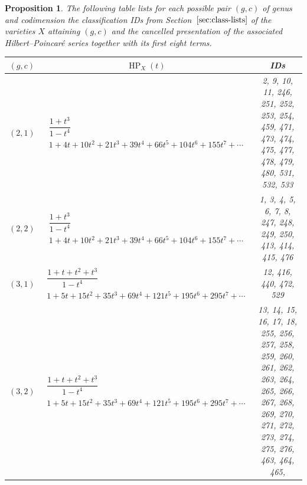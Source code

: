 \documentclass[pdftex]{sigma}%
\newtheorem{prop}[thm]{Proposition}
\theoremstyle{definition}
\DeclareMathOperator\HP{HP}
\numberwithin{equation}{section}
\begin{document}
\begin{prop}
The following table lists for each possible pair $(g,c)$
of genus and codimension the classification IDs
from Section~$\ref{sec:class-lists}$ of the varieties
$X$ attaining $(g,c)$ and the cancelled presentation
of the associated Hilbert--Poincar\'{e}
series together with its first eight terms.
\begin{table}[h!]\centering\setlength{\tabcolsep}{4.5pt}
\renewcommand{\arraystretch}{1.4}\small\tabulinesep=1mm
\begin{tabu}{c|c|c}\hline
 $(g,c)$ & $\HP_X(t)$ & {\rm IDs}
 \\
 \hline
$(2,1)$\label{T(1,2)}
&$\begin{array}{c}
 \dfrac{1+t^3}{1-t^4} \\[10pt]
 {1+4t+10t^2+21t^3+39t^4+66t^5+104t^6+155t^7+\cdots}
\end{array}$
& \begin{minipage}{4cm} \rm
 2, 9, 10, 11, 246, 251, 252, 253, 254, 459,
 471, 473, 474, 475, 477, 478, 479, 480, 531, 532, 533
 \end{minipage}
\\
\hline
$(2,2)$\label{T(2,2)}
&$\begin{array}{c}
\dfrac{1+t^3}{1-t^4} \\[10pt]
{1+4t+10t^2+21t^3+39t^4+66t^5+104t^6+155t^7+\cdots}
\end{array}$
& \begin{minipage}{4cm} \rm
 1, 3, 4, 5, 6, 7, 8, 247, 248, 249,
 250, 413, 414, 415, 476
 \end{minipage}
\\
\hline
$(3,1)$\label{T(1,3)}
&$\begin{array}{c}
\dfrac{1+t+t^2+t^3}{1-t^4} \\[10pt]
{1+5t+15t^2+35t^3+69t^4+121t^5+195t^6+295t^7+\cdots}
\end{array}$
&\begin{minipage}{4cm} \rm
 12, 416, 440, 472, 529
 \end{minipage}
\\
\hline
$(3,2)$\label{T(2,3)}
&$\begin{array}{c}
 \dfrac{1+t+t^2+t^3}{1-t^4} \\[15pt]
{1+5t+15t^2+35t^3+69t^4+121t^5+195t^6+295t^7+\cdots}
\end{array}$
& \begin{minipage}{4cm} \rm
 13, 14, 15, 16, 17, 18, 255, 256, 257, 258, 259,
 260, 261, 262, 263, 264, 265, 266, 267, 268, 269,
 270, 271, 272, 273, 274, 275, 276, 463, 464, 465,

\end{minipage}
\end{tabu}
\end{table}
\end{prop}
\end{document}
